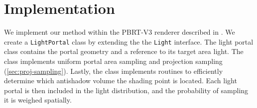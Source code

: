 \section{Implementation}
\label{sec:implementation}

We implement our method within the PBRT-V3 renderer described in \cite*{pharrPhysicallyBasedRendering2016}. We create a \texttt{LightPortal} class by extending the the \texttt{Light} interface. The light portal class contains the portal geometry and a reference to its target area light. The class implements uniform portal area sampling and projection sampling (\autoref{sec:proj-sampling}). Lastly, the class implements routines to efficiently determine which antishadow volume the shading point is located. Each light portal is then included in the light distribution, and the probability of sampling it is weighed spatially.

